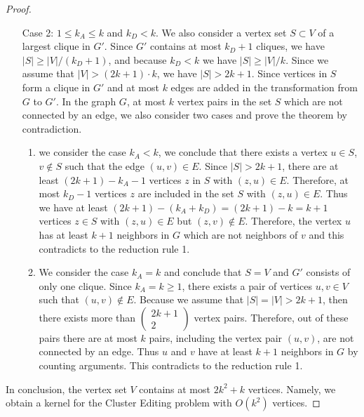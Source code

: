 \documentclass{article}
\begin{document}
\begin{proof}
\begin{enumerate}
\item[Case 2:] \(1 \leq k_A \leq k\) and \(k_D < k\). We also consider a vertex set \(S \subset V\) of a largest clique in \(G'\). Since \(G'\) contains at most \(k_D+1\) cliques, we have \(|S| \geq |V|/(k_D+1)\), and because \(k_D < k\) we have \(|S| \geq |V|/k\). Since we assume that \(|V|>(2k+1)\cdot k\), we have \(|S| > 2k+1\). Since vertices in \(S\) form a clique in \(G'\) and at most \(k\) edges are added in the transformation from \(G\) to \(G'\). In the graph \(G\), at most \(k\) vertex pairs in the set \(S\) which are not connected by an edge, we also consider two cases and prove the theorem by contradiction.
    \begin{enumerate}
    \item we consider the case \(k_A < k\), we conclude that there exists a vertex \(u \in S\), \(v \notin S\) such that the edge \((u,v) \in E\). Since \(|S|>2k+1\), there are at least \((2k+1)-k_A-1\) vertices \(z\) in \(S\) with \((z,u) \in E\). Therefore, at most \(k_D-1\) vertices \(z\) are included in the set \(S\) with \((z,u) \in E\). Thus we have at least \((2k+1)-(k_A+k_D)=(2k+1)-k=k+1\) vertices \(z \in S\) with \((z,u) \in E\) but \((z,v) \notin E\). Therefore, the vertex \(u\) has at least \(k+1\) neighbors in \(G\) which are not neighbors of \(v\) and this contradicts to the reduction rule 1.
    
    
    
\item We consider the case \(k_A=k\) and conclude that \(S =V\) and \(G'\) consists of only one clique. Since \(k_A=k\geq 1\), there exists a pair of vertices \(u,v \in V\) such that \((u,v) \notin E\). Because we assume that \(|S|=|V| > 2k+1\), then there exists more than
\(\left(
\begin{array}{c}
2k+1\\
2
\end{array}
\right)\)
vertex pairs. Therefore, out of these pairs there are at most \(k\) pairs, including the vertex pair \((u,v)\), are not connected by an edge. Thus \(u\) and \(v\) have at least \(k+1\) neighbors in \(G\) by counting arguments. This contradicts to the reduction rule 1.
\end{enumerate}


\end{enumerate}
In conclusion, the vertex set \(V\) contains at most \(2k^2+k\) vertices. Namely, we obtain a kernel for the Cluster Editing problem with \(O(k^2)\) vertices.
\end{proof}
\end{document}
